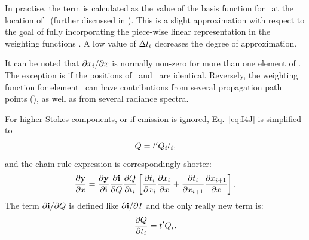 In practise, the term is calculated as the value of the basis function for
\SttElm\ at the location of \ (further discussed in
\citet{buehler:artst:05}). This is a slight approximation with respect to the
goal of fully incorporating the piece-wise linear representation in the
weighting functions \citep{buehler:artst:05}. A low value of
$\Delta l_{i}$ decreases the degree of approximation.

It can be noted that $\partial x_{i} / \partial x$ is normally non-zero
for more than one element of \SttVct. The exception is if the positions of
\ and \SttElm\ are identical. Reversely, the weighting function for
element \SttElm\ can have contributions from several propagation path points
(), as well as from several radiance spectra. 

For higher Stokes components, or if emission is ignored, Eq.~\ref{eq:I4J} is
simplified to
\begin{equation}
  \label{eq:Q4J}
  Q = t'Q_{i}t_{i},
\end{equation}
and the chain rule expression is correspondingly shorter:
\begin{equation}
  \frac{\partial\mathbf{y}}{\partial x} =  
  \frac{\partial\mathbf{y}}{\partial\mathbf{i}}
  \frac{\partial\mathbf{i}}{\partial Q} 
  \frac{\partial Q}{\partial t_{i}}
  \left[
    \frac{\partial t_{i}}{\partial x_{i}}
    \frac{\partial x_{i}}{\partial x} + 
    \frac{\partial t_{i}}{\partial x_{i+1}}  
    \frac{\partial x_{i+1}}{\partial x} 
  \right].
  \label{eq:chainrule1q}
\end{equation}
The term $\partial\mathbf{i}/\partial Q$ is defined like
$\partial\mathbf{i}/\partial I$ and the only really new term is:
\begin{equation}
  \frac{\partial Q}{\partial t_{i}} 
      = t'Q_{i}.
\end{equation}


